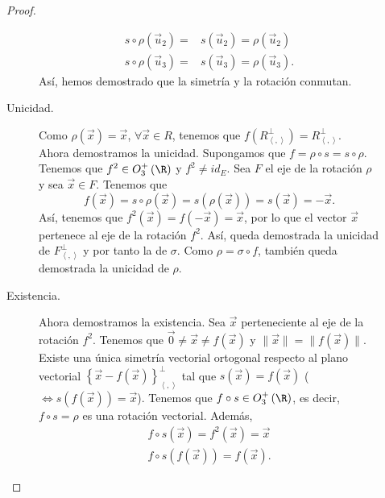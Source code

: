 \begin{description}
\begin{proof}
\begin{description}
\[\begin{split}
	s\circ \rho\left(\vec{u}_{2}\right) = & s\left(\vec{u}_{2}\right) = \rho\left(\vec{u}_{2}\right) \\
	s\circ\rho\left(\vec{u}_{3}\right) = & s\left(\vec{u}_{3}\right) = \rho\left(\vec{u}_{3}\right).
\end{split}
\]
Así, hemos demostrado que la simetría y la rotación conmutan.
\item[Unicidad.] Como $\displaystyle \rho\left(\vec{x}\right) = \vec{x} $, $\displaystyle \forall \vec{x} \in R $, tenemos que $\displaystyle f\left(R^{\perp }_{\left\langle ,  \right\rangle }\right) = R^{\perp }_{\left\langle ,  \right\rangle } $. \\
Ahora demostramos la unicidad. Supongamos que $\displaystyle f = \rho\circ s = s\circ \rho $. Tenemos que $\displaystyle f^{2} \in O_{3}^{+}\left(\R\right) $ y $\displaystyle f^{2} \neq id _{E} $. Sea $\displaystyle F $ el eje de la rotación $\displaystyle \rho $ y sea $\displaystyle \vec{x} \in F $. Tenemos que
\[f\left(\vec{x}\right) = s\circ\rho\left(\vec{x}\right) = s\left(\rho\left(\vec{x}\right)\right) = s\left(\vec{x}\right) = -\vec{x} .\]
Así, tenemos que $\displaystyle f^{2}\left(\vec{x}\right)=f\left(-\vec{x}\right)=\vec{x} $, por lo que el vector $\displaystyle \vec{x} $ pertenece al eje de la rotación $\displaystyle f^{2} $. Así, queda demostrada la unicidad de $\displaystyle F^{\perp }_{\left\langle ,  \right\rangle } $ y por tanto la de $\displaystyle \sigma  $. Como $\displaystyle \rho = \sigma \circ f $, también queda demostrada la unicidad de $\displaystyle \rho $.
\item[Existencia.] Ahora demostramos la existencia. Sea $\displaystyle \vec{x}  $ perteneciente al eje de la rotación $\displaystyle f^{2} $. Tenemos que $\displaystyle \vec{0} \neq \vec{x} \neq f\left(\vec{x}\right) $ y $\displaystyle \|\vec{x}\| = \|f\left(\vec{x}\right)\| $. Existe una única simetría vectorial ortogonal respecto al plano vectorial $\displaystyle \left\{ \vec{x}-f\left(\vec{x}\right)\right\} ^{\perp }_{\left\langle ,  \right\rangle } $ tal que $\displaystyle s\left(\vec{x}\right) = f\left(\vec{x}\right) $ ($\displaystyle \iff s\left(f\left(\vec{x}\right)\right) = \vec{x} $).
Tenemos que $\displaystyle f\circ s \in O^{+}_{3}\left(\R\right) $, es decir, $\displaystyle f\circ s =\rho$ es una rotación vectorial. Además,
\[
\begin{split}
f\circ s\left(\vec{x}\right) = f^{2}\left(\vec{x}\right) = \vec{x} \\
f\circ s\left(f\left(\vec{x}\right)\right) = f\left(\vec{x}\right).

\end{split}\]
\end{description}
\end{proof}
\end{description}

